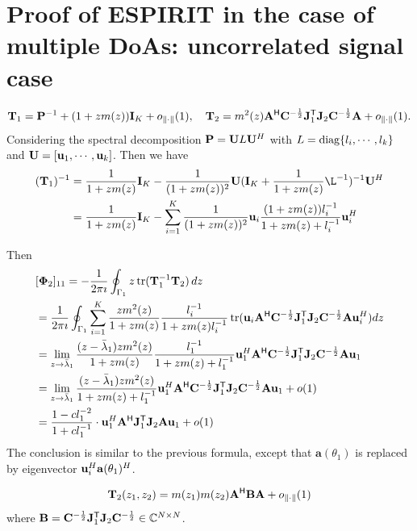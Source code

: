 \documentclass[11pt,a4paper]{article}
\begin{document}
\section{Proof of ESPIRIT in the case of multiple DoAs: uncorrelated signal case}
\begin{equation}
	\mathbf{T}_1 = {\mathbf{P}}^{-1} + (1 + zm(z) ) \mathbf{I}_K + o_{\| \cdot \|}(1), \quad \mathbf{T}_2 = m^2(z) {\mathbf{A}}^{\sf H} {\mathbf{C}}^{-\frac12} {\mathbf{J}}_1^{\sf T} {\mathbf{J}}_2 {\mathbf{C}}^{-\frac12} {\mathbf{A}} + o_{\| \cdot \|}(1).
\end{equation}
Considering the spectral decomposition ${\mathbf{P}} = {\mathbf{U}} L {\mathbf{U}}^H$ with $L = \operatorname{diag}\{l_i,\cdots,l_k\}$ and ${\mathbf{U}}=[\mathbf{u}_1,\cdots,\mathbf{u}_k]$.
Then we have
\begin{align*}
    (\mathbf{T}_1)^{-1} &= \frac{1}{1+zm(z)}\I_K - \frac{1}{(1+zm(z))^2} \U (\I_K+\frac{1}{1+zm(z)}\L^{-1})^{-1} \U^H \\
    &=  \frac{1}{1+zm(z)}\I_K - \sum_{i=1}^{K}\frac{1}{(1+zm(z))^2} \uu_i \frac{(1+zm(z))l_i^{-1}}{1+zm(z)+l_i^{-1}} \uu_i^H
\end{align*}

Then
\begin{align*}
    &[{\boldsymbol{\Phi}}_2]_{11} = -\frac1{2 \pi \imath} \oint_{\Gamma_1} z \operatorname{tr} (  \mathbf{T}_1^{-1} \mathbf{T}_2 )\,dz \\ 
    &= \frac1{2 \pi \imath} \oint_{\Gamma_1} \sum_{i=1}^{K} \frac{zm^2(z)}{1+zm(z)} \frac{l_i^{-1}}{1+zm(z)l_i^{-1}} \operatorname{tr}(\mathbf{u}_i {\mathbf{A}}^{\sf H} {\mathbf{C}}^{-\frac12} {\mathbf{J}}_1^{\sf T} {\mathbf{J}}_2 {\mathbf{C}}^{-\frac12} {\mathbf{A}} \mathbf{u}_i^H ) dz  \\
    &= \lim_{z \to \bar \lambda_1 } \frac{(z-\bar \lambda_1)zm^2(z)}{1+zm(z)} \frac{l_1^{-1}}{1+zm(z)+l_1^{-1}} \mathbf{u}_1^H {\mathbf{A}}^{\sf H} {\mathbf{C}}^{-\frac12} {\mathbf{J}}_1^{\sf T} {\mathbf{J}}_2 {\mathbf{C}}^{-\frac12} {\mathbf{A}} \mathbf{u}_1  \\
    &= \lim_{z \to \bar \lambda_1 } \frac{(z-\bar \lambda_1)zm^2(z)}{1+zm(z)+l_1^{-1}} \mathbf{u}_1^H {\mathbf{A}}^{\sf H} {\mathbf{C}}^{-\frac12} {\mathbf{J}}_1^{\sf T} {\mathbf{J}}_2 {\mathbf{C}}^{-\frac12} {\mathbf{A}} \mathbf{u}_1 + o(1) \\
    &= \frac{1- c l_1^{-2}}{ 1 + c l_1^{-1} } \cdot \mathbf{u}_1^H {\mathbf{A}}^{\sf H} {\mathbf{J}}_1^{\sf T} {\mathbf{J}}_2 {\mathbf{A}} \mathbf{u}_1 + o(1)
\end{align*}
The conclusion is similar to the previous formula, except that $\mathbf{a}(\theta_1)$ is replaced by eigenvector $\mathbf{u}_i^H \mathbf{a}(\theta_1)^H$.

\begin{align*}
    \mathbf{T}_2(z_1, z_2) = m(z_1) m(z_2) {\mathbf{A}}^{\sf H} \mathbf{B} {\mathbf{A}} + o_{\| \cdot \|}(1)
\end{align*}
where $\mathbf{B} = {\mathbf{C}}^{-\frac12} {\mathbf{J}}_1^{\sf T} {\mathbf{J}}_2 {\mathbf{C}}^{-\frac12} \in {\mathbb{C}}^{N \times N}$.
\end{document}
